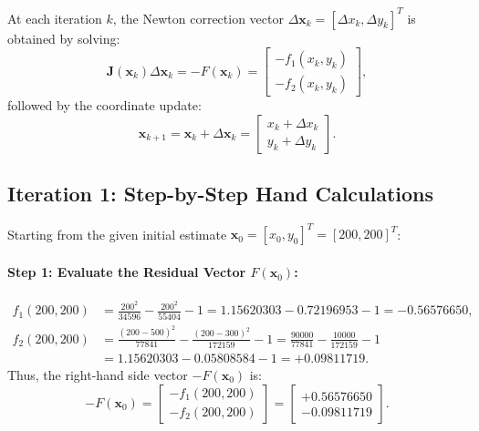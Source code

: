 \documentclass[11pt,a4paper]{article}
\begin{document}
At each iteration $k$, the Newton correction vector $\Delta \mathbf{x}_k = [\Delta x_k, \Delta y_k]^T$ is obtained by solving:
\begin{equation}
    \mathbf{J}(\mathbf{x}_k) \Delta \mathbf{x}_k = -F(\mathbf{x}_k) = 
    \begin{bmatrix}
        -f_1(x_k, y_k) \\
        -f_2(x_k, y_k)
    \end{bmatrix},
\end{equation}
followed by the coordinate update:
\begin{equation}
    \mathbf{x}_{k+1} = \mathbf{x}_k + \Delta \mathbf{x}_k = 
    \begin{bmatrix}
        x_k + \Delta x_k \\
        y_k + \Delta y_k
    \end{bmatrix}.
\end{equation}

\subsection{Iteration 1: Step-by-Step Hand Calculations}
Starting from the given initial estimate $\mathbf{x}_0 = [x_0, y_0]^T = [200, 200]^T$:

\paragraph{Step 1: Evaluate the Residual Vector $F(\mathbf{x}_0)$:}
\begin{align*}
    f_1(200, 200) &= \frac{200^2}{34596} - \frac{200^2}{55404} - 1 = 1.15620303 - 0.72196953 - 1 = -0.56576650, \\
    f_2(200, 200) &= \frac{(200 - 500)^2}{77841} - \frac{(200 - 300)^2}{172159} - 1 = \frac{90000}{77841} - \frac{10000}{172159} - 1 \\
                  &= 1.15620303 - 0.05808584 - 1 = +0.09811719.
\end{align*}
Thus, the right-hand side vector $-F(\mathbf{x}_0)$ is:
\begin{equation*}
    -F(\mathbf{x}_0) = 
    \begin{bmatrix}
        -f_1(200, 200) \\
        -f_2(200, 200)
    \end{bmatrix}
    =
    \begin{bmatrix}
        +0.56576650 \\
        -0.09811719
    \end{bmatrix}.
\end{equation*}
\end{document}
